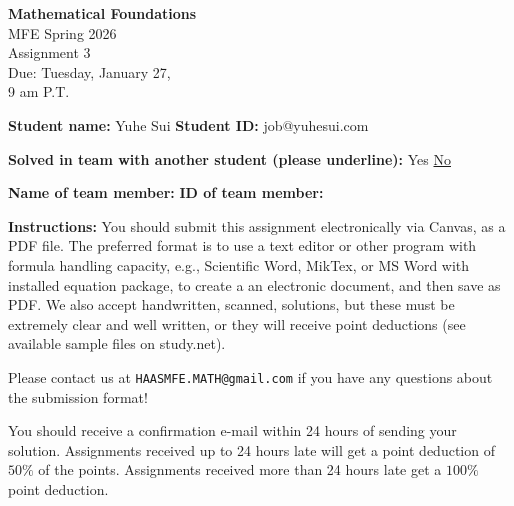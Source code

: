 \documentclass{article}
\begin{document}
\begin{center}
\textbf{Mathematical Foundations} \\
MFE Spring 2026 \\
Assignment 3 \\
Due: Tuesday, January 27, \\
9 am P.T.
\end{center}

\vspace{1em}

\noindent \textbf{Student name:} Yuhe Sui \hspace{3.54cm} \textbf{Student ID:} job@yuhesui.com

\vspace{1em}

\noindent \textbf{Solved in team with another student (please underline):} \hspace{1cm} Yes \hspace{1cm} \underline{No}

\vspace{1em}

\noindent \textbf{Name of team member:} \hspace{3cm} \textbf{ID of team member:}

\vspace{1em}

\noindent \textbf{Instructions:} You should submit this assignment electronically via Canvas, as a PDF file. The preferred format is to use a text editor or other program with formula handling capacity, e.g., Scientific Word, MikTex, or MS Word with installed equation package, to create a an electronic document, and then save as PDF. We also accept handwritten, scanned, solutions, but these must be extremely clear and well written, or they will receive point deductions (see available sample files on study.net).

\vspace{1em}

\noindent Please contact us at \texttt{HAASMFE.MATH@gmail.com} if you have any questions about the submission format!

\vspace{1em}

\noindent You should receive a confirmation e-mail within 24 hours of sending your solution. Assignments received up to 24 hours late will get a point deduction of $50\%$ of the points. Assignments received more than 24 hours late get a $100\%$ point deduction.

\vspace{1em}
\end{document}
